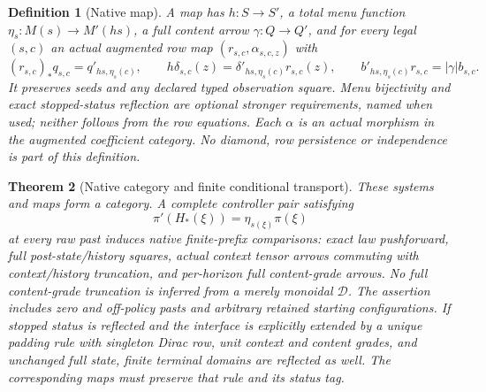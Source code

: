\documentclass[11pt]{article}
\newtheorem{theorem}{Theorem}\newtheorem{proposition}[theorem]{Proposition}\newtheorem{definition}[theorem]{Definition}
\begin{document}
\begin{definition}[Native map]
A map has $h:S\to S'$, a total menu function $\eta_s:M(s)\to M'(hs)$, a full content arrow $\gamma:Q\to Q'$, and for every legal $(s,c)$ an actual augmented row map $(r_{s,c},\alpha_{s,c,z})$ with
\[
 (r_{s,c})_*q_{s,c}=q'_{hs,\eta_s(c)},\qquad
 h\delta_{s,c}(z)=\delta'_{hs,\eta_s(c)}r_{s,c}(z),\qquad
 b'_{hs,\eta_s(c)}r_{s,c}=|\gamma|b_{s,c}.
\]
It preserves seeds and any declared typed observation square. Menu bijectivity and exact stopped-status reflection are optional stronger requirements, named when used; neither follows from the row equations. Each $\alpha$ is an actual morphism in the augmented coefficient category. No diamond, row persistence or independence is part of this definition.
\end{definition}
\begin{theorem}[Native category and finite conditional transport]
These systems and maps form a category. A complete controller pair satisfying
\[
 \pi'(H_*(\xi))=\eta_{s(\xi)}\pi(\xi)
\]
at every raw past induces native finite-prefix comparisons: exact law pushforward, full post-state/history squares, actual context tensor arrows commuting with context/history truncation, and per-horizon full content-grade arrows. No full content-grade truncation is inferred from a merely monoidal $\mathcal D$. The assertion includes zero and off-policy pasts and arbitrary retained starting configurations. If stopped status is reflected and the interface is explicitly extended by a unique padding rule with singleton Dirac row, unit context and content grades, and unchanged full state, finite terminal domains are reflected as well. The corresponding maps must preserve that rule and its status tag.
\end{theorem}
\end{document}
